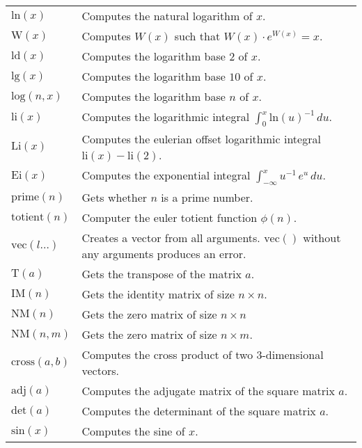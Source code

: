 \documentclass[10pt]{article}
\newcommand{\tabgap}{\vspace{3mm}\\}
\begin{document}
\begin{longtable}{p{}p{}}
        $ \mathrm{ln}(x) $                         & Computes the natural logarithm of $ x $. \\
        $ \mathrm{W}(x) $                          & Computes $ W(x) $ such that $ W(x) \cdot e^{W(x)} = x $. \\
        $ \mathrm{ld}(x) $                         & Computes the logarithm base $ 2 $ of $ x $. \\
        $ \mathrm{lg}(x) $                         & Computes the logarithm base $ 10 $ of $ x $. \\
        $ \mathrm{log}(n, x) $                     & Computes the logarithm base $ n $ of $ x $. \tabgap
        $ \mathrm{li}(x) $                         & Computes the logarithmic integral $ \int_0^x \mathrm{ln}(u)^{-1}\,du $. \\
        $ \mathrm{Li}(x) $                         & Computes the eulerian offset logarithmic integral $ \mathrm{li}(x) - \mathrm{li}(2) $. \\
        $ \mathrm{Ei}(x) $                         & Computes the exponential integral $ \int_{-\infty}^x u^{-1}\,e^u\,du $. \tabgap
        $ \mathrm{prime}(n) $                      & Gets whether $ n $ is a prime number. \\
        $ \mathrm{totient}(n) $                    & Computer the euler totient function $ \phi(n) $. \tabgap
        $ \mathrm{vec}(l\dots) $                   & Creates a vector from all arguments. $ \mathrm{vec}() $ without any arguments produces an error. \\
        $ \mathrm{T}(a) $                          & Gets the transpose of the matrix $ a $. \\
        $ \mathrm{IM}(n) $                         & Gets the identity matrix of size $ n\times n $. \\
        $ \mathrm{NM}(n) $                         & Gets the zero matrix of size $ n\times n $ \\
        $ \mathrm{NM}(n,m) $                       & Gets the zero matrix of size $ n\times m $. \\
        $ \mathrm{cross}(a, b) $                   & Computes the cross product of two $ 3 $-dimensional vectors. \\
        $ \mathrm{adj}(a) $                        & Computes the adjugate matrix of the square matrix $ a $. \\
        $ \mathrm{det}(a) $                        & Computes the determinant of the square matrix $ a $. \tabgap
        $ \mathrm{sin}(x) $                        & Computes the sine of $ x $. \\

\end{longtable}
\end{document}
